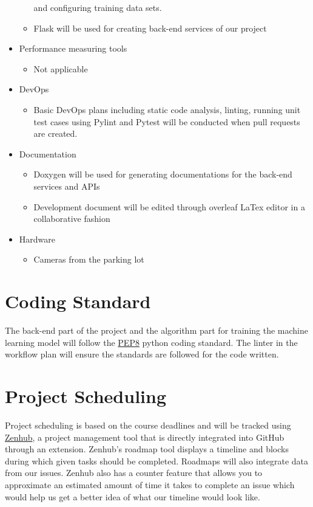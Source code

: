 \documentclass[12pt,letterpaper]{article}
\begin{document}
\begin{itemize}
\begin{itemize}
        and configuring training data sets.
        \item Flask will be used for creating back-end services of our project
    \end{itemize}
    \item Performance measuring tools
    \begin{itemize}
        \item Not applicable
    \end{itemize}
    \item DevOps
    \begin{itemize}
        \item Basic DevOps plans including static code analysis, linting,
        running unit test cases using Pylint and Pytest will be conducted when
        pull requests are created.
    \end{itemize}
    \item Documentation
    \begin{itemize}
        \item Doxygen will be used for generating documentations for the
        back-end services and APIs
        \item Development document will be edited through overleaf LaTex editor
        in a collaborative fashion
    \end{itemize}
    \item Hardware
    \begin{itemize}
        \item Cameras from the parking lot 
    \end{itemize}
\end{itemize}

\section{Coding Standard}
The back-end part of the project and the algorithm part for training the machine
learning model will follow the \href{https://peps.python.org/pep-0008/} {PEP8}
python coding standard. The linter in the workflow plan will ensure the
standards are followed for the code written.

\section{Project Scheduling}
Project scheduling is based on the course deadlines and will be tracked using
\href{https://www.zenhub.com/}{Zenhub}, a project management tool that is
directly integrated into GitHub through an extension. Zenhub's roadmap tool
displays a timeline and blocks during which given tasks should be completed.
Roadmaps will also integrate data from our issues. Zenhub also has a counter
feature that allows you to approximate an estimated amount of time it takes to
complete an issue which would help us get a better idea of what our timeline
would look like.
\end{document}
